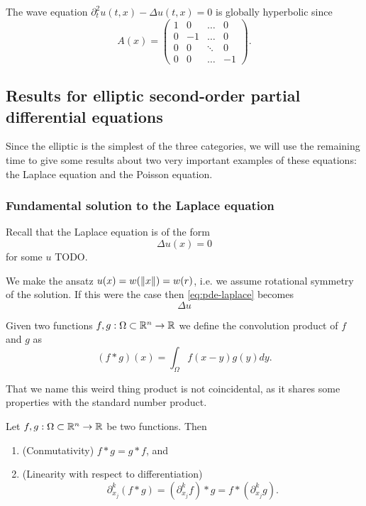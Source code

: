 \begin{eg}
  The wave equation $\partial^2_t u(t, x) - \Delta u(t, x) = 0$ is globally
  hyperbolic since
  \[
    A(x) =
    \left(
      \begin{array}{c|ccc}
        1 & 0 & \dots & 0 \\ \hline
        0 & -1 & \dots & 0 \\
        0 & 0 & \ddots & 0 \\
        0 & 0 & \dots & -1
      \end{array}
    \right).
  \]
\end{eg}

\subsection{Results for elliptic second-order partial differential equations}

Since the elliptic is the simplest of the three categories, we will use the
remaining time to give some results about two very important examples of these
equations: the Laplace equation and the Poisson equation.

\subsubsection{Fundamental solution to the Laplace equation}

Recall that the Laplace equation is of the form
\begin{equation}
  \label{eq:pde-laplace}
  \Delta u(x) = 0
\end{equation}
for some $u$ TODO.

We make the ansatz $u(x) = w(\left\Vert{x}\right\Vert) = w(r)$, i.e. we assume rotational
symmetry of the solution. If this were the case then \eqref{eq:pde-laplace} becomes
\[
\Delta u
\]

\begin{dfn}

  Given two functions $f, g : \Omega \subset \mathbb{R}^n \to \mathbb{R}$ we define the
  convolution product of $f$ and $g$ as
  \[
    (f \ast g)(x) = \int_\Omega f(x - y) g(y) dy.
  \]
\end{dfn}

That we name this weird thing product is not coincidental, as it shares some
properties with the standard number product.

\begin{thm}
   Let $f, g : \Omega \subset \mathbb{R}^n \to \mathbb{R}$ be two functions. Then
   \begin{enumerate}
     \item (Conmutativity) $f \ast g = g \ast f$, and
     \item (Linearity with respect to differentiation)
       \[
         \partial_{x_j}^k (f \ast g)
         = (\partial_{x_j}^k f) \ast g
         = f \ast ( \partial_{x_j}^k g).
       \]
   \end{enumerate}
\end{thm}

